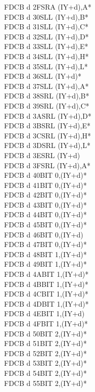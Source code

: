 \documentclass[oneside,a4paper]{book}
\begin{document}
\begin{multicols}{3}
{\begin{tabbing}
FDCB d 2F\>SRA (IY+d),A*\\
FDCB d 30\>SLL (IY+d),B*\\
FDCB d 31\>SLL (IY+d),C*\\
FDCB d 32\>SLL (IY+d),D*\\
FDCB d 33\>SLL (IY+d),E*\\
FDCB d 34\>SLL (IY+d),H*\\
FDCB d 35\>SLL (IY+d),L*\\
FDCB d 36\>SLL (IY+d)*\\
FDCB d 37\>SLL (IY+d),A*\\
FDCB d 38\>SRL (IY+d),B*\\
FDCB d 39\>SRL (IY+d),C*\\
FDCB d 3A\>SRL (IY+d),D*\\
FDCB d 3B\>SRL (IY+d),E*\\
FDCB d 3C\>SRL (IY+d),H*\\
FDCB d 3D\>SRL (IY+d),L*\\
FDCB d 3E\>SRL (IY+d)\\
FDCB d 3F\>SRL (IY+d),A*\\
FDCB d 40\>BIT 0,(IY+d)*\\
FDCB d 41\>BIT 0,(IY+d)*\\
FDCB d 42\>BIT 0,(IY+d)*\\
FDCB d 43\>BIT 0,(IY+d)*\\
FDCB d 44\>BIT 0,(IY+d)*\\
FDCB d 45\>BIT 0,(IY+d)*\\
FDCB d 46\>BIT 0,(IY+d)\\
FDCB d 47\>BIT 0,(IY+d)*\\
FDCB d 48\>BIT 1,(IY+d)*\\
FDCB d 49\>BIT 1,(IY+d)*\\
FDCB d 4A\>BIT 1,(IY+d)*\\
FDCB d 4B\>BIT 1,(IY+d)*\\
FDCB d 4C\>BIT 1,(IY+d)*\\
FDCB d 4D\>BIT 1,(IY+d)*\\
FDCB d 4E\>BIT 1,(IY+d)\\
FDCB d 4F\>BIT 1,(IY+d)*\\
FDCB d 50\>BIT 2,(IY+d)*\\
FDCB d 51\>BIT 2,(IY+d)*\\
FDCB d 52\>BIT 2,(IY+d)*\\
FDCB d 53\>BIT 2,(IY+d)*\\
FDCB d 54\>BIT 2,(IY+d)*\\
FDCB d 55\>BIT 2,(IY+d)*\\

\end{tabbing}}
\end{multicols}
\end{document}
